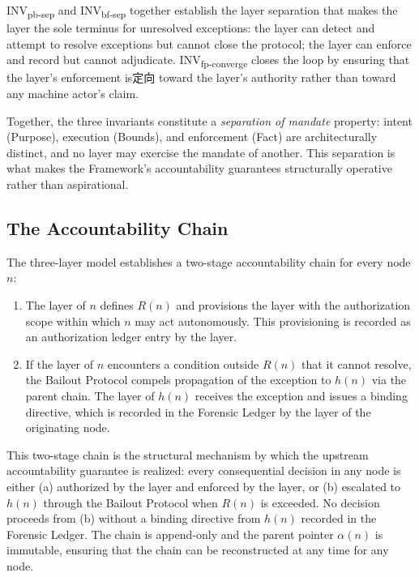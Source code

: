 INV\textsubscript{pb-sep} and INV\textsubscript{bf-sep} together establish the
layer separation that makes the \purpose{} layer the sole terminus for
unresolved exceptions: the \bounds{} layer can detect and attempt to resolve
exceptions but cannot close the protocol; the \fact{} layer can enforce and
record but cannot adjudicate.  INV\textsubscript{fp-converge} closes the loop
by ensuring that the \fact{} layer's enforcement is定向 toward the
\purpose{} layer's authority rather than toward any machine actor's claim.

Together, the three invariants constitute a \emph{separation of mandate}
property: intent (Purpose), execution (Bounds), and enforcement (Fact) are
architecturally distinct, and no layer may exercise the mandate of another.
This separation is what makes the \bxthree{} Framework's accountability
guarantees structurally operative rather than aspirational.

\subsection{The Accountability Chain}\label{sec:accountability-chain}

The three-layer model establishes a two-stage accountability chain for every
\bxthree{} node $n$:

\begin{enumerate}\itemsep=0pt
\item[(i)] The \purpose{} layer of $n$ defines $R(n)$ and provisions the
\bounds{} layer with the authorization scope within which $n$ may act
autonomously.  This provisioning is recorded as an authorization ledger entry
by the \fact{} layer.

\item[(ii)] If the \bounds{} layer of $n$ encounters a condition outside $R(n)$
that it cannot resolve, the Bailout Protocol compels propagation of the
exception to $h(n)$ via the parent chain.  The \purpose{} layer of $h(n)$
receives the exception and issues a binding directive, which is recorded in
the Forensic Ledger by the \fact{} layer of the originating node.
\end{enumerate}

This two-stage chain is the structural mechanism by which the upstream
accountability guarantee is realized: every consequential decision in any
\bxthree{} node is either (a) authorized by the \purpose{} layer and enforced
by the \fact{} layer, or (b) escalated to $h(n)$ through the Bailout
Protocol when $R(n)$ is exceeded.  No decision proceeds from (b) without a
binding directive from $h(n)$ recorded in the Forensic Ledger.  The chain
is append-only and the parent pointer $\alpha(n)$ is immutable, ensuring
that the chain can be reconstructed at any time for any node.